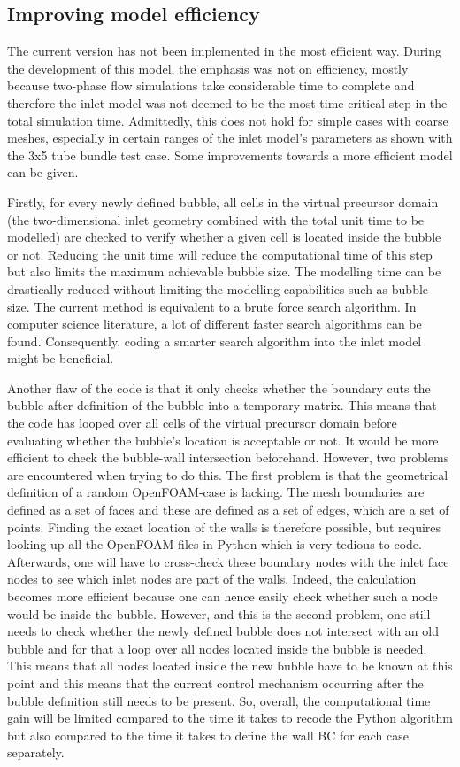 \documentclass[fleqn,10pt,a4paper,twoside,english]{book}
\begin{document}
\subsection{Improving model efficiency}
The current version has not been implemented in the most efficient way. During the development of this model, the emphasis was not on efficiency, mostly because two-phase flow simulations take considerable time to complete and therefore the inlet model was not deemed to be the most time-critical step in the total simulation time. Admittedly, this does not hold for simple cases with coarse meshes, especially in certain ranges of the inlet model's parameters as shown with the 3x5 tube bundle test case. Some improvements towards a more efficient model can be given.
\par Firstly, for every newly defined bubble, all cells in the virtual precursor domain (the two-dimensional inlet geometry combined with the total unit time to be modelled) are checked to verify whether a given cell is located inside the bubble or not. Reducing the unit time will reduce the computational time of this step but also limits the maximum achievable bubble size. The modelling time can be drastically reduced without limiting the modelling capabilities such as bubble size. The current method is equivalent to a brute force search algorithm. In computer science literature, a lot of different faster search algorithms can be found. Consequently, coding a smarter search algorithm into the inlet model might be beneficial.
\par Another flaw of the code is that it only checks whether the boundary cuts the bubble after definition of the bubble into a temporary matrix. This means that the code has looped over all cells of the virtual precursor domain before evaluating whether the bubble's location is acceptable or not. It would be more efficient to check the bubble-wall intersection beforehand. However, two problems are encountered when trying to do this. The first problem is that the geometrical definition of a random OpenFOAM-case is lacking. The mesh boundaries are defined as a set of faces and these are defined as a set of edges, which are a set of points. Finding the exact location of the walls is therefore possible, but requires looking up all the OpenFOAM-files in Python which is very tedious to code. Afterwards, one will have to cross-check these boundary nodes with the inlet face nodes to see which inlet nodes are part of the walls. Indeed, the calculation becomes more efficient because one can hence easily check whether such a node would be inside the bubble. However, and this is the second problem, one still needs to check whether the newly defined bubble does not intersect with an old bubble and for that a loop over all nodes located inside the bubble is needed. This means that all nodes located inside the new bubble have to be known at this point and this means that the current control mechanism occurring after the bubble definition still needs to be present. So, overall, the computational time gain will be limited compared to the time it takes to recode the Python algorithm but also compared to the time it takes to define the wall BC for each case separately.
\end{document}

